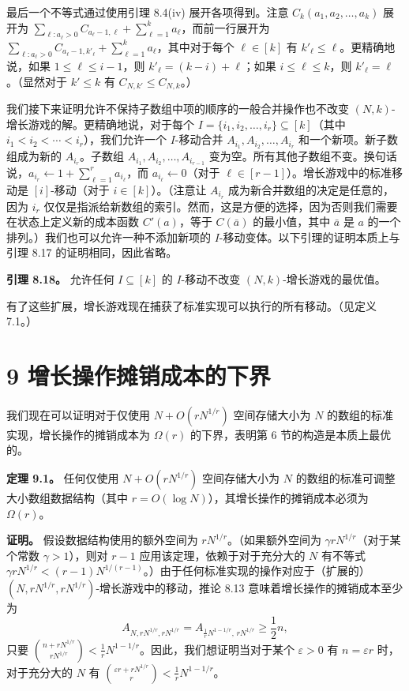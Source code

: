 \documentclass[12pt,a4paper]{ctexart}
\theoremstyle{remark}
\begin{document}
最后一个不等式通过使用引理 8.4(iv) 展开各项得到。注意 $C_k(a_1,a_2,\ldots,a_k)$ 展开为 $\sum_{\ell:a_\ell>0}C_{a_\ell-1,\ell}+\sum_{\ell=1}^{k}a_\ell$，而前一行展开为 $\sum_{\ell:a_\ell>0}C_{a_\ell-1,k'_\ell}+\sum_{\ell=1}^{k}a_\ell$，其中对于每个 $\ell\in[k]$ 有 $k'_\ell\leq\ell$。更精确地说，如果 $1\leq\ell\leq i-1$，则 $k'_\ell=(k-i)+\ell$；如果 $i\leq\ell\leq k$，则 $k'_\ell=\ell$。（显然对于 $k'\leq k$ 有 $C_{N,k'}\leq C_{N,k}$。）

我们接下来证明允许不保持子数组中项的顺序的一般合并操作也不改变 $(N,k)$-增长游戏的解。更精确地说，对于每个 $I=\{i_1,i_2,\ldots,i_r\}\subseteq[k]$（其中 $i_1<i_2<\cdots<i_r$），我们允许一个 $I$-移动合并 $A_{i_1},A_{i_2},\ldots,A_{i_r}$ 和一个新项。新子数组成为新的 $A_{i_r}$。子数组 $A_{i_1},A_{i_2},\ldots,A_{i_{r-1}}$ 变为空。所有其他子数组不变。换句话说，$a_{i_r}\leftarrow 1+\sum_{\ell=1}^{r}a_{i_\ell}$，而 $a_{i_\ell}\leftarrow 0$（对于 $\ell\in[r-1]$）。增长游戏中的标准移动是 $[i]$-移动（对于 $i\in[k]$）。（注意让 $A_{i_r}$ 成为新合并数组的决定是任意的，因为 $i_r$ 仅仅是指派给新数组的索引。然而，这是方便的选择，因为否则我们需要在状态上定义新的成本函数 $C'(a)$，等于 $C(\bar{a})$ 的最小值，其中 $\bar{a}$ 是 $a$ 的一个排列。）我们也可以允许一种不添加新项的 $I$-移动变体。以下引理的证明本质上与引理 8.17 的证明相同，因此省略。

\textbf{引理 8.18。} 允许任何 $I\subseteq[k]$ 的 $I$-移动不改变 $(N,k)$-增长游戏的最优值。

有了这些扩展，增长游戏现在捕获了标准实现可以执行的所有移动。（见定义 7.1。）

\section{9 增长操作摊销成本的下界}

我们现在可以证明对于仅使用 $N+O(rN^{1/r})$ 空间存储大小为 $N$ 的数组的标准实现，增长操作的摊销成本为 $\Omega(r)$ 的下界，表明第 6 节的构造是本质上最优的。

\textbf{定理 9.1。} 任何仅使用 $N+O(rN^{1/r})$ 空间存储大小为 $N$ 的数组的标准可调整大小数组数据结构（其中 $r=O(\log N)$），其增长操作的摊销成本必须为 $\Omega(r)$。

\textbf{证明。} 假设数据结构使用的额外空间为 $rN^{1/r}$。（如果额外空间为 $\gamma rN^{1/r}$（对于某个常数 $\gamma>1$），则对 $r-1$ 应用该定理，依赖于对于充分大的 $N$ 有不等式 $\gamma rN^{1/r}<(r-1)N^{1/(r-1)}$。）由于任何标准实现的操作对应于（扩展的）$(N,rN^{1/r},rN^{1/r})$-增长游戏中的移动，推论 8.13 意味着增长操作的摊销成本至少为
$$A_{N,rN^{1/r},rN^{1/r}} = A_{\frac{1}{r}N^{1-1/r},\,rN^{1/r}} \geq \frac{1}{2}n,$$
只要 $\binom{n+rN^{1/r}}{rN^{1/r}} < \frac{1}{r}N^{1-1/r}$。因此，我们想证明当对于某个 $\varepsilon>0$ 有 $n=\varepsilon r$ 时，对于充分大的 $N$ 有 $\binom{\varepsilon r+rN^{1/r}}{r} < \frac{1}{r}N^{1-1/r}$。
\end{document}
